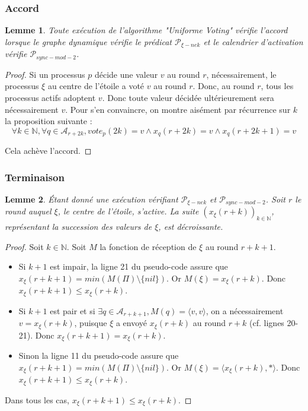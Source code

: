 \documentclass{article}
\newtheorem{lemma}{Lemme}[section]
\begin{document}
\subsubsection{Accord}

\begin{lemma}
	Toute exécution de l'algorithme "Uniforme Voting" vérifie l'accord lorsque le graphe dynamique vérifie le prédicat $\mathcal{P}_{\xi-nek}$
	et le calendrier d'activation vérifie $\mathcal{P}_{sync-mod-2}$.
\end{lemma}
\begin{proof}
	Si un processus $p$ décide une valeur $v$ au round $r$, nécessairement, le processus $\xi$ au centre de l'étoile a voté $v$ au round $r$.
	Donc, au round $r$, tous les processus actifs adoptent $v$.
	Donc toute valeur décidée ultérieurement sera nécessairement $v$. Pour s'en convaincre, on montre aisément par récurrence sur $k$ la proposition suivante :
	$$\forall k \in \mathds{N}, \forall q \in \mathcal{A}_{r+2k}, vote_p(2k) = v \wedge x_q(r+2k) = v \wedge x_q(r+2k+1) = v$$

	Cela achève l'accord.
\end{proof}

\subsubsection{Terminaison}

	\begin{lemma}
		Étant donné une exécution vérifiant $\mathcal{P}_{\xi-nek}$ et $\mathcal{P}_{sync-mod-2}$.
		Soit $r$ le round auquel $\xi$, le centre de l'étoile, s'active.
		La suite $(x_\xi(r+k))_{k \in \mathds{N}}$, représentant la succession des valeurs de $\xi$, est décroissante.
	\end{lemma}
	\begin{proof}
		Soit $k \in \mathds{N}$. Soit $M$ la fonction de réception de $\xi$ au round $r+k+1$.
		\begin{itemize}

			\item Si $k+1$ est impair, la ligne 21 du pseudo-code assure que $x_\xi(r+k+1) = min(M(\Pi) \setminus \{nil\})$.
				Or $M(\xi) = x_\xi(r+k)$.  Donc $x_\xi(r+k+1) \leq x_\xi(r+k)$.
			\item Si $k+1$ est pair et si $\exists q \in \mathcal{A}_{r+k+1}, M(q) = \langle v, v \rangle$,
				on a nécessairement $v = x_\xi(r+k)$, puisque $\xi$ a envoyé $x_\xi(r+k)$ au round $r+k$ (cf. lignes 20-21).
				Donc $x_\xi(r+k+1) = x_\xi(r+k)$.
			\item Sinon la ligne 11 du pseudo-code assure que $x_\xi(r+k+1) = min(M(\Pi) \setminus \{nil\})$.
				Or $M(\xi) = \langle x_\xi(r+k), * \rangle$.
				Donc $x_\xi(r+k+1) \leq x_\xi(r+k)$.

		\end{itemize}
		Dans tous les cas, $x_\xi(r+k+1) \leq x_\xi(r+k)$.
	\end{proof}
		
\end{document}
